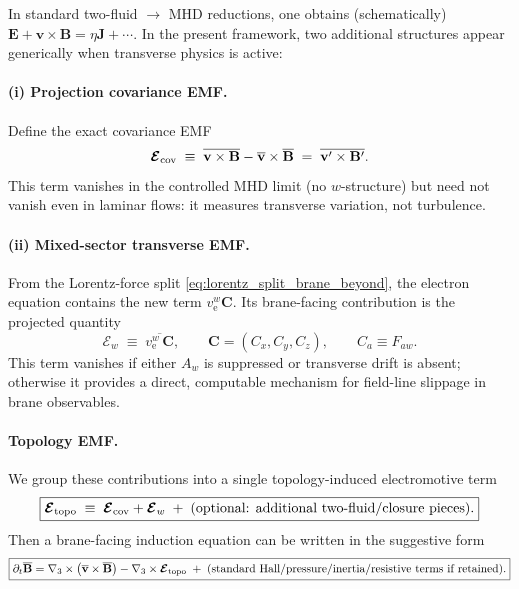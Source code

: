 \documentclass[11pt]{article}
\newcommand{\ele}{\mathrm{e}}
\begin{document}
In standard two-fluid \(\to\) MHD reductions, one obtains (schematically)
\(\mathbf{E}+\mathbf{v}\times\mathbf{B}=\eta\mathbf{J}+\cdots\). In the present framework,
two additional structures appear generically when transverse physics is active:

\paragraph{(i) Projection covariance EMF.}
Define the exact covariance EMF
\begin{equation}
\boldsymbol{\mathcal{E}}_{\rm cov}
\;\equiv\;
\overline{\mathbf{v}\times\mathbf{B}}-\overline{\mathbf{v}}\times\overline{\mathbf{B}}
\;=\;
\overline{\mathbf{v}'\times\mathbf{B}'}.
\label{eq:Ecov_def_beyond}
\end{equation}
This term vanishes in the controlled MHD limit (no \(w\)-structure) but need not vanish
even in laminar flows: it measures transverse variation, not turbulence.

\paragraph{(ii) Mixed-sector transverse EMF.}
From the Lorentz-force split \eqref{eq:lorentz_split_brane_beyond}, the electron equation
contains the new term \(v_\ele^w \mathbf{C}\). Its brane-facing contribution is the projected
quantity
\begin{equation}
\boldsymbol{\mathcal{E}}_{w}
\;\equiv\;
\overline{v_\ele^w\,\mathbf{C}},
\qquad \mathbf{C}=(C_x,C_y,C_z),\qquad C_a\equiv F_{aw}.
\label{eq:Ew_def_beyond2}
\end{equation}
This term vanishes if either \(A_w\) is suppressed or transverse drift is absent; otherwise it
provides a direct, computable mechanism for field-line slippage in brane observables.

\paragraph{Topology EMF.}
We group these contributions into a single topology-induced electromotive term
\begin{equation}
\boxed{
\boldsymbol{\mathcal{E}}_{\rm topo}
\;\equiv\;
\boldsymbol{\mathcal{E}}_{\rm cov} + \boldsymbol{\mathcal{E}}_{w}
\;+\;(\text{optional: additional two-fluid/closure pieces}).
}
\label{eq:Etopo_def_beyond}
\end{equation}
Then a brane-facing induction equation can be written in the suggestive form
\begin{equation}
\boxed{
\partial_t \overline{\mathbf{B}}
=
\nabla_3\times\big(\overline{\mathbf{v}}\times\overline{\mathbf{B}}\big)
-\nabla_3\times \boldsymbol{\mathcal{E}}_{\rm topo}
\;+\;\text{(standard Hall/pressure/inertia/resistive terms if retained)}.
}
\label{eq:induction_with_topo_emf_beyond}
\end{equation}
\end{document}
